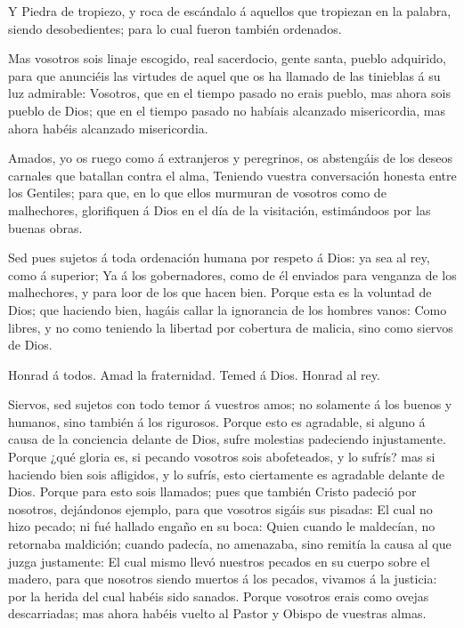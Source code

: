  Y Piedra de tropiezo, y roca de escándalo á aquellos que
tropiezan en la palabra, siendo desobedientes; para lo cual fueron
también ordenados.

 Mas vosotros sois linaje escogido, real sacerdocio, gente
santa, pueblo adquirido, para que anunciéis las virtudes de aquel que os
ha llamado de las tinieblas á su luz admirable:  Vosotros,
que en el tiempo pasado no erais pueblo, mas ahora sois pueblo de Dios;
que en el tiempo pasado no habíais alcanzado misericordia, mas ahora
habéis alcanzado misericordia.

 Amados, yo os ruego como á extranjeros y peregrinos, os
abstengáis de los deseos carnales que batallan contra el alma,
 Teniendo vuestra conversación honesta entre los Gentiles;
para que, en lo que ellos murmuran de vosotros como de malhechores,
glorifiquen á Dios en el día de la visitación, estimándoos por las
buenas obras.

 Sed pues sujetos á toda ordenación humana por respeto á
Dios: ya sea al rey, como á superior;  Ya á los
gobernadores, como de él enviados para venganza de los malhechores, y
para loor de los que hacen bien.  Porque esta es la
voluntad de Dios; que haciendo bien, hagáis callar la ignorancia de los
hombres vanos:  Como libres, y no como teniendo la libertad
por cobertura de malicia, sino como siervos de Dios.

 Honrad á todos. Amad la fraternidad. Temed á Dios. Honrad
al rey.

 Siervos, sed sujetos con todo temor á vuestros amos; no
solamente á los buenos y humanos, sino también á los rigurosos.
 Porque esto es agradable, si alguno á causa de la
conciencia delante de Dios, sufre molestias padeciendo injustamente.
 Porque ¿qué gloria es, si pecando vosotros sois
abofeteados, y lo sufrís? mas si haciendo bien sois afligidos, y lo
sufrís, esto ciertamente es agradable delante de Dios. 
Porque para esto sois llamados; pues que también Cristo padeció por
nosotros, dejándonos ejemplo, para que vosotros sigáis sus pisadas:
 El cual no hizo pecado; ni fué hallado engaño en su boca:
 Quien cuando le maldecían, no retornaba maldición; cuando
padecía, no amenazaba, sino remitía la causa al que juzga justamente:
 El cual mismo llevó nuestros pecados en su cuerpo sobre el
madero, para que nosotros siendo muertos á los pecados, vivamos á la
justicia: por la herida del cual habéis sido sanados. 
Porque vosotros erais como ovejas descarriadas; mas ahora habéis vuelto
al Pastor y Obispo de vuestras almas.

